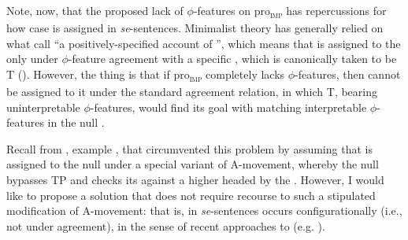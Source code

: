 \documentclass[output=paper,nonflat,newtxmath]{langsci/langscibook}
\begin{document}
Note, now, that the proposed lack of $\phi$-features on pro\textsubscript{\textsc{imp}} has repercussions for how case is assigned in  \textit{se}-sentences.   Minimalist theory has generally relied on what \citet{kornfilt2015} call “a positively-specified account of '', which means that  is assigned to the  only under $\phi$-feature agreement with a specific , which is canonically taken to be T (\citealt{chomsky2001}). However, the thing is that if pro\textsubscript{\textsc{imp}} completely lacks $\phi$-features, then  cannot be assigned to it under the standard agreement relation, in which T, bearing uninterpretable $\phi$-features, would find its goal with matching interpretable $\phi$-features in the null .

Recall from , example , that \citet{riverosheppard2003} circumvented this problem by assuming that  is assigned to the null  under a special variant of A-movement, whereby the null   bypasses TP and checks its  against a higher  headed by the . However, I would like to propose a solution that does not require recourse to such a stipulated modification of A-movement: that is,   in  \textit{se}-sentences occurs configurationally (i.e., not under agreement), in the sense of recent approaches to  (e.g. \citealt{levin2015,kornfilt2015}).
\end{document}
